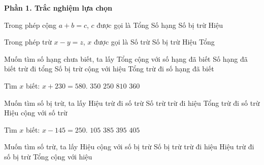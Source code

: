 \textbf{Phần 1. Trắc nghiệm lựa chọn}

\begin{ex} %
Trong phép cộng $a + b = c$, $c$ được gọi là
\choice
{\True Tổng}
{Số hạng}
{Số bị trừ}
{Hiệu}
\end{ex}

\begin{ex} %
Trong phép trừ $x - y = z$, $x$ được gọi là
\choice
{Số trừ}
{\True Số bị trừ}
{Hiệu}
{Tổng}
\end{ex}

\begin{ex} %
Muốn tìm số hạng chưa biết, ta lấy
\choice
{Tổng cộng với số hạng đã biết}
{Số hạng đã biết trừ đi tổng}
{Số bị trừ cộng với hiệu}
{\True Tổng trừ đi số hạng đã biết}
\end{ex}

\begin{ex} %
Tìm $x$ biết: $x + 230 = 580$.
\choice
{\True $350$}
{$250$}
{$810$}
{$360$}
\end{ex}

\begin{ex} %
Muốn tìm số bị trừ, ta lấy
\choice
{Hiệu trừ đi số trừ}
{Số trừ trừ đi hiệu}
{Tổng trừ đi số trừ}
{\True Hiệu cộng với số trừ}
\end{ex}

\begin{ex} %
Tìm $x$ biết: $x - 145 = 250$.
\choice
{$105$}
{$385$}
{\True $395$}
{$405$}
\end{ex}

\begin{ex} %
Muốn tìm số trừ, ta lấy
\choice
{Hiệu cộng với số bị trừ}
{\True Số bị trừ trừ đi hiệu}
{Hiệu trừ đi số bị trừ}
{Tổng cộng với hiệu}
\end{ex}

